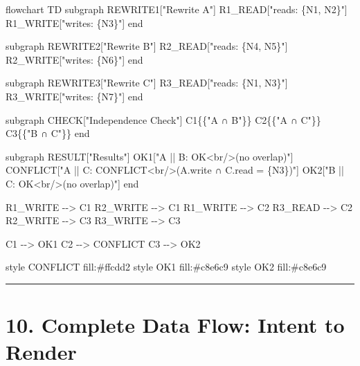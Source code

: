 \documentclass[
]{book}
\newenvironment{Shaded}{}{}
\newcommand{\NormalTok}[1]{#1}
\begin{document}
\begin{Shaded}
\begin{Highlighting}[]
\NormalTok{flowchart TD}
\NormalTok{    subgraph REWRITE1["Rewrite A"]}
\NormalTok{        R1\_READ["reads: \{N1, N2\}"]}
\NormalTok{        R1\_WRITE["writes: \{N3\}"]}
\NormalTok{    end}

\NormalTok{    subgraph REWRITE2["Rewrite B"]}
\NormalTok{        R2\_READ["reads: \{N4, N5\}"]}
\NormalTok{        R2\_WRITE["writes: \{N6\}"]}
\NormalTok{    end}

\NormalTok{    subgraph REWRITE3["Rewrite C"]}
\NormalTok{        R3\_READ["reads: \{N1, N3\}"]}
\NormalTok{        R3\_WRITE["writes: \{N7\}"]}
\NormalTok{    end}

\NormalTok{    subgraph CHECK["Independence Check"]}
\NormalTok{        C1\{\{"A ∩ B"\}\}}
\NormalTok{        C2\{\{"A ∩ C"\}\}}
\NormalTok{        C3\{\{"B ∩ C"\}\}}
\NormalTok{    end}

\NormalTok{    subgraph RESULT["Results"]}
\NormalTok{        OK1["A || B: OK\textless{}br/\textgreater{}(no overlap)"]}
\NormalTok{        CONFLICT["A || C: CONFLICT\textless{}br/\textgreater{}(A.write ∩ C.read = \{N3\})"]}
\NormalTok{        OK2["B || C: OK\textless{}br/\textgreater{}(no overlap)"]}
\NormalTok{    end}

\NormalTok{    R1\_WRITE {-}{-}\textgreater{} C1}
\NormalTok{    R2\_WRITE {-}{-}\textgreater{} C1}
\NormalTok{    R1\_WRITE {-}{-}\textgreater{} C2}
\NormalTok{    R3\_READ {-}{-}\textgreater{} C2}
\NormalTok{    R2\_WRITE {-}{-}\textgreater{} C3}
\NormalTok{    R3\_WRITE {-}{-}\textgreater{} C3}

\NormalTok{    C1 {-}{-}\textgreater{} OK1}
\NormalTok{    C2 {-}{-}\textgreater{} CONFLICT}
\NormalTok{    C3 {-}{-}\textgreater{} OK2}

\NormalTok{    style CONFLICT fill:\#ffcdd2}
\NormalTok{    style OK1 fill:\#c8e6c9}
\NormalTok{    style OK2 fill:\#c8e6c9}
\end{Highlighting}
\end{Shaded}

\begin{center}\rule{0.5\linewidth}{0.5pt}\end{center}

\section{10. Complete Data Flow: Intent to
Render}\label{complete-data-flow-intent-to-render}
\end{document}
